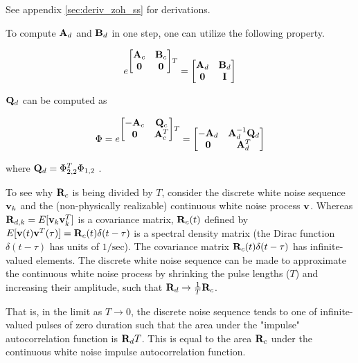 See appendix \ref{sec:deriv_zoh_ss} for derivations.

To compute $\mathbf{A}_d$ and $\mathbf{B}_d$ in one step, one can utilize the
following property.

\begin{equation*}
  e^{
  \begin{bmatrix}
    \mathbf{A}_c & \mathbf{B}_c \\
    \mathbf{0} & \mathbf{0}
  \end{bmatrix}T} =
  \begin{bmatrix}
    \mathbf{A}_d & \mathbf{B}_d \\
    \mathbf{0} & \mathbf{I}
  \end{bmatrix}
\end{equation*}

$\mathbf{Q}_d$ can be computed as

\begin{equation*}
  \Phi = e^{
  \begin{bmatrix}
    -\mathbf{A}_c & \mathbf{Q}_c \\
    \mathbf{0} & \mathbf{A}_c^T
  \end{bmatrix}T} =
  \begin{bmatrix}
    -\mathbf{A}_d & \mathbf{A}_d^{-1} \mathbf{Q}_d \\
    \mathbf{0} & \mathbf{A}_d^T
  \end{bmatrix}
\end{equation*}

where $\mathbf{Q}_d = \Phi_{2,2}^T \Phi_{1,2}$ \cite{bib:integral_matrix_exp}.

To see why $\mathbf{R}_c$ is being divided by $T$, consider the discrete white
noise sequence $\mathbf{v}_k$ and the (non-physically realizable) continuous white
noise process $\mathbf{v}$. Whereas $\mathbf{R}_{d,k} = E[\mathbf{v}_k \mathbf{v}_k^T]$ is a
covariance matrix, $\mathbf{R}_c(t)$ defined by
$E[\mathbf{v}(t) \mathbf{v}^T(\tau)] = \mathbf{R}_c(t)\delta(t - \tau)$ is a spectral
density matrix (the Dirac function $\delta(t - \tau)$ has units of
$1/\text{sec}$). The covariance matrix $\mathbf{R}_c(t)\delta(t - \tau)$ has
infinite-valued elements. The discrete white noise sequence can be made to
approximate the continuous white noise process by shrinking the pulse lengths
($T$) and increasing their amplitude, such that
$\mathbf{R}_d \rightarrow \frac{1}{T}\mathbf{R}_c$.

That is, in the limit as $T \rightarrow 0$, the discrete noise sequence tends to
one of infinite-valued pulses of zero duration such that the area under the
"impulse" autocorrelation function is $\mathbf{R}_d T$. This is equal to the area
$\mathbf{R}_c$ under the continuous white noise impulse autocorrelation function.
